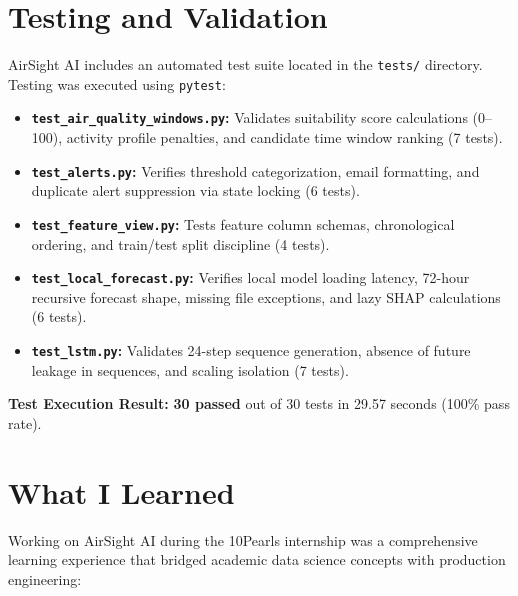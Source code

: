 \documentclass[12pt,a4paper]{article}
\begin{document}
\section{Testing and Validation}

AirSight AI includes an automated test suite located in the \texttt{tests/} directory. Testing was executed using \texttt{pytest}:

\begin{itemize}
    \item \textbf{\texttt{test\_air\_quality\_windows.py}:} Validates suitability score calculations (0--100), activity profile penalties, and candidate time window ranking (7 tests).
    \item \textbf{\texttt{test\_alerts.py}:} Verifies threshold categorization, email formatting, and duplicate alert suppression via state locking (6 tests).
    \item \textbf{\texttt{test\_feature\_view.py}:} Tests feature column schemas, chronological ordering, and train/test split discipline (4 tests).
    \item \textbf{\texttt{test\_local\_forecast.py}:} Verifies local model loading latency, 72-hour recursive forecast shape, missing file exceptions, and lazy SHAP calculations (6 tests).
    \item \textbf{\texttt{test\_lstm.py}:} Validates 24-step sequence generation, absence of future leakage in sequences, and scaling isolation (7 tests).
\end{itemize}

\textbf{Test Execution Result:} \textbf{30 passed} out of 30 tests in 29.57 seconds (100\% pass rate).

\section{What I Learned}

Working on AirSight AI during the 10Pearls internship was a comprehensive learning experience that bridged academic data science concepts with production engineering:
\end{document}
